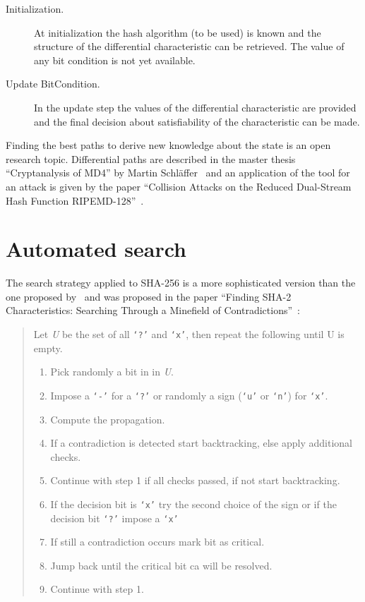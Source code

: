 \begin{description}
  \item[Initialization.]
    At initialization the hash algorithm (to be used) is known and the structure of the differential characteristic can be retrieved. The value of any bit condition is not yet available.
  \item[Update BitCondition.]
    In the update step the values of the differential characteristic are provided and the final decision about satisfiability of the characteristic can be made.
\end{description}

Finding the best paths to derive new knowledge about the state is an open research topic. Differential paths are described in the master thesis ``Cryptanalysis of MD4'' by Martin Schläffer~\cite{Cry15} and an application of the tool for an attack is given by the paper ``Collision Attacks on the Reduced Dual-Stream Hash Function RIPEMD-128''~\cite{Cry08}.

\section{Automated search}
\label{sec:automated-search}
%
The search strategy applied to SHA-256 is a more sophisticated version than the one proposed by~\cite[10]{Cry01} and was proposed in the paper ``Finding SHA-2 Characteristics: Searching Through a Minefield of Contradictions''~\cite[298]{Cry07}:
\begin{quote}
Let \emph U be the set of all \texttt{`?'} and \texttt{`x'}, then repeat the following until U is empty.
\begin{enumerate}
  \item Pick randomly a bit in in \emph U.
  \item Impose a \texttt{`-'} for a \texttt{`?'} or randomly a sign (\texttt{`u'} or \texttt{`n'}) for \texttt{`x'}.
  \item Compute the propagation.
  \item If a contradiction is detected start backtracking, else apply additional checks.
  \item Continue with step 1 if all checks passed, if not start backtracking.
  \item If the decision bit is \texttt{`x'} try the second choice of the sign or if the decision bit \texttt{`?'} impose a \texttt{`x'}
  \item If still a contradiction occurs mark bit as critical.
  \item Jump back until the critical bit ca will be resolved.
  \item Continue with step 1.
\end{enumerate}
\end{quote}

